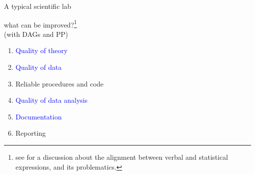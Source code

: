 %
%
\begin{lhframe}[rhgraphic={\texttt{[image: car\_salesman.jpg]}}]
	{A typical scientific lab}
	
	what can be improved?\footnote{see \citet{Yarkoni_2020, Rohrer_et_al_2021} for a discussion about the alignment between verbal and statistical expressions, and its problematics.}\\
	{\small (with DAGs and PP)}
	\begin{enumerate}
		\item \textcolor{blue}{Quality of theory}
		\item \textcolor{blue}{Quality of data}
		\item \alert{Reliable procedures and code}
		\item \textcolor{blue}{Quality of data analysis}
		\item \textcolor{blue}{Documentation}
		\item Reporting
	\end{enumerate}
\end{lhframe}
%
%
